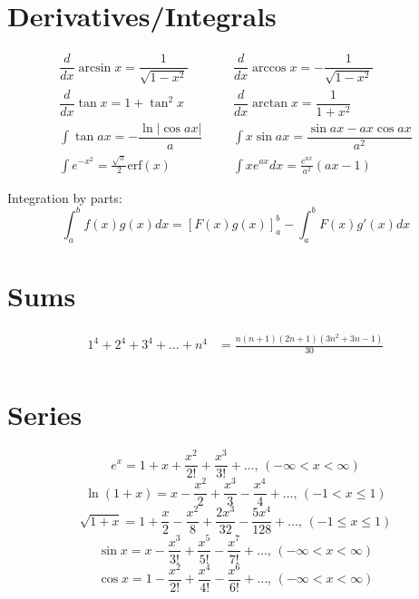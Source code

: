 \section{Derivatives/Integrals}
\begin{align*}
	\dfrac{d}{dx}\arcsin x = \dfrac{1}{\sqrt{1-x^2}} &&& \dfrac{d}{dx}\arccos x = -\dfrac{1}{\sqrt{1-x^2}} \\
	\dfrac{d}{dx}\tan x = 1+\tan^2 x &&& \dfrac{d}{dx}\arctan x = \dfrac{1}{1+x^2} \\
	\int\tan ax = -\dfrac{\ln|\cos ax|}{a} &&& \int x\sin ax = \dfrac{\sin ax-ax \cos ax}{a^2} \\
	\int e^{-x^2} = \frac{\sqrt \pi}{2} \text{erf}(x) &&& \int xe^{ax}dx = \frac{e^{ax}}{a^2}(ax-1)
\end{align*}

Integration by parts:
\[\int_a^bf(x)g(x)dx = [F(x)g(x)]_a^b-\int_a^bF(x)g'(x)dx\]

\section{Sums}
\begin{align*}
	1^4 + 2^4 + 3^4 + \dots + n^4 &= \frac{n(n+1)(2n+1)(3n^2 + 3n - 1)}{30} \\
\end{align*}

\section{Series}
$$e^x = 1+x+\frac{x^2}{2!}+\frac{x^3}{3!}+\dots,\,(-\infty<x<\infty)$$
$$\ln(1+x) = x-\frac{x^2}{2}+\frac{x^3}{3}-\frac{x^4}{4}+\dots,\,(-1<x\leq1)$$
$$\sqrt{1+x} = 1+\frac{x}{2}-\frac{x^2}{8}+\frac{2x^3}{32}-\frac{5x^4}{128}+\dots,\,(-1\leq x\leq1)$$
$$\sin x = x-\frac{x^3}{3!}+\frac{x^5}{5!}-\frac{x^7}{7!}+\dots,\,(-\infty<x<\infty)$$
$$\cos x = 1-\frac{x^2}{2!}+\frac{x^4}{4!}-\frac{x^6}{6!}+\dots,\,(-\infty<x<\infty)$$


